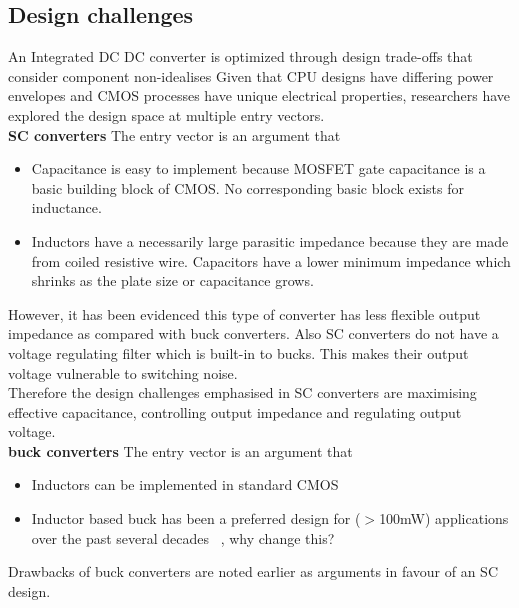 \documentclass[letterpaper,twocolumn,10pt]{article}
\begin{document}
\subsection{Design challenges}
An Integrated DC DC converter is optimized through design trade-offs that consider component non-idealises Given that CPU designs have differing power envelopes and CMOS processes have unique electrical properties, researchers have explored the design space at multiple entry vectors.\\  
\indent \textbf{SC converters} The entry vector is an argument that
\begin{itemize}
\item{Capacitance is easy to implement because MOSFET gate capacitance is a basic building block of CMOS. No corresponding basic block exists for inductance.}
\item{Inductors have a necessarily large parasitic impedance because they are made from coiled resistive wire. Capacitors have a lower minimum impedance which shrinks as the plate size or capacitance grows.}
\end{itemize}
 
However, it has been evidenced this type of converter has less flexible output impedance as compared with buck converters. Also SC converters do not have a voltage regulating filter which is built-in to bucks. This makes their output voltage vulnerable to switching noise.\\
Therefore the design challenges emphasised in SC converters are maximising effective capacitance, controlling output impedance and regulating output voltage.\\ 
\textbf{buck converters} The entry vector is an argument that
\begin{itemize}
\item{Inductors can be implemented in standard CMOS} 
\item{Inductor based buck has been a preferred design for ($>$100mW) applications over the past several decades ~\cite{Sanders2010}, why change this?}
\end{itemize}

Drawbacks of buck converters are noted earlier as arguments in favour of an SC design.
\end{document}
